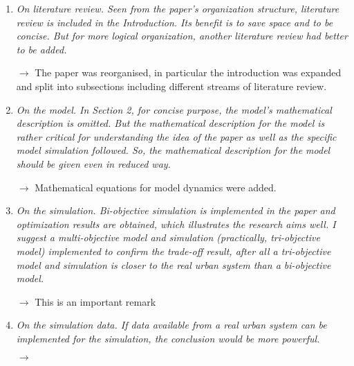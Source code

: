\documentclass[10pt,a4paper,sans]{moderncv}        %
\begin{document}
\begin{enumerate}
    \item \textit{On literature review. Seen from the paper's organization structure, literature review is included in the Introduction. Its benefit is to save space and to be concise. But for more logical organization, another literature review had better to be added.}
    
    \medskip
    
    $\rightarrow$ The paper was reorganised, in particular the introduction was expanded and split into subsections including different streams of literature review.
    
    \bigskip
    
    \item \textit{On the model. In Section 2, for concise purpose, the model's mathematical description is omitted. But the mathematical description for the model is rather critical for understanding the idea of the paper as well as the specific model simulation followed. So, the mathematical description for the model should be given even in reduced way.}
    
    \medskip
    
    $\rightarrow$ Mathematical equations for model dynamics were added.
    
    \bigskip
    
    \item \textit{On the simulation. Bi-objective simulation is implemented in the paper and optimization results are obtained, which illustrates the research aims well. I suggest a multi-objective model and simulation (practically, tri-objective model) implemented to confirm the trade-off result, after all a tri-objective model and simulation is closer to the real urban system than a bi-objective model.}
    
    \medskip
    
    $\rightarrow$ This is an important remark
    
    \bigskip
    
    \item \textit{On the simulation data. If data available from a real urban system can be implemented for the simulation, the conclusion would be more powerful.}
    
    \medskip

    $\rightarrow$ 
    
\end{enumerate}
\end{document}
